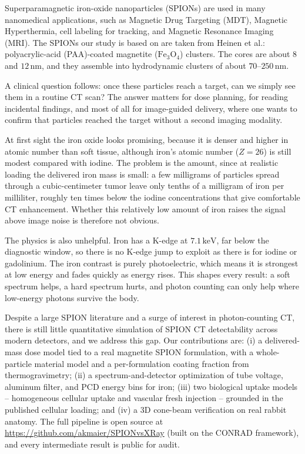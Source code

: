 \documentclass[]{spie}  %
\begin{document}
Superparamagnetic iron-oxide nanoparticles (SPIONs) are used in many nanomedical
applications, such as Magnetic Drug Targeting (MDT), Magnetic Hyperthermia, cell
labeling for tracking, and Magnetic Resonance Imaging (MRI). The SPIONs our study is
based on are taken from Heinen et al.\cite{Heinen2026}: polyacrylic-acid (PAA)-coated
magnetite ($\mathrm{Fe_3O_4}$) clusters. The cores are about $8$ and $12\,\mathrm{nm}$,
and they assemble into hydrodynamic clusters of about $70$--$250\,\mathrm{nm}$.

A clinical question follows: once these particles reach a target, can we simply see
them in a routine CT scan? The answer matters for dose planning, for reading
incidental findings, and most of all for image-guided delivery, where one wants to
confirm that particles reached the target without a second imaging
modality\cite{Maier2019}.

At first sight the iron oxide looks promising, because it is denser and higher in
atomic number than soft tissue, although iron's atomic number ($Z=26$) is still modest
compared with iodine. The problem is the amount, since at realistic loading the
delivered iron mass is small: a few milligrams of particles spread through a
cubic-centimeter tumor leave only tenths of a milligram of iron per milliliter,
roughly ten times below the iodine concentrations that give comfortable CT
enhancement. Whether this relatively low amount of iron raises the signal above image
noise is therefore not obvious.

The physics is also unhelpful. Iron has a K-edge at $7.1\,\mathrm{keV}$, far below
the diagnostic window, so there is no K-edge jump to exploit as there is for iodine or
gadolinium. The iron contrast is purely photoelectric, which means it is strongest at
low energy and fades quickly as energy rises. This shapes every result: a soft
spectrum helps, a hard spectrum hurts, and photon counting can only help where
low-energy photons survive the body.

Despite a large SPION literature and a surge of interest in photon-counting
CT\cite{Willemink2018,Faby2015,DeMan2007,Goldmann2026},
there is still little quantitative simulation of SPION CT detectability across modern
detectors, and we address this gap. Our contributions are: (i) a delivered-mass dose
model tied to a real magnetite SPION formulation, with a whole-particle material
model and a per-formulation coating fraction from thermogravimetry; (ii) a
spectrum-and-detector optimization of tube voltage, aluminum filter, and PCD energy
bins for iron; (iii) two biological uptake models -- homogeneous cellular uptake and
vascular fresh injection -- grounded in the published cellular loading; and
(iv) a 3D cone-beam verification on real rabbit anatomy. The full pipeline is open
source at \url{https://github.com/akmaier/SPIONvsXRay} (built on the CONRAD
framework), and every intermediate result is public for audit.
\end{document}
